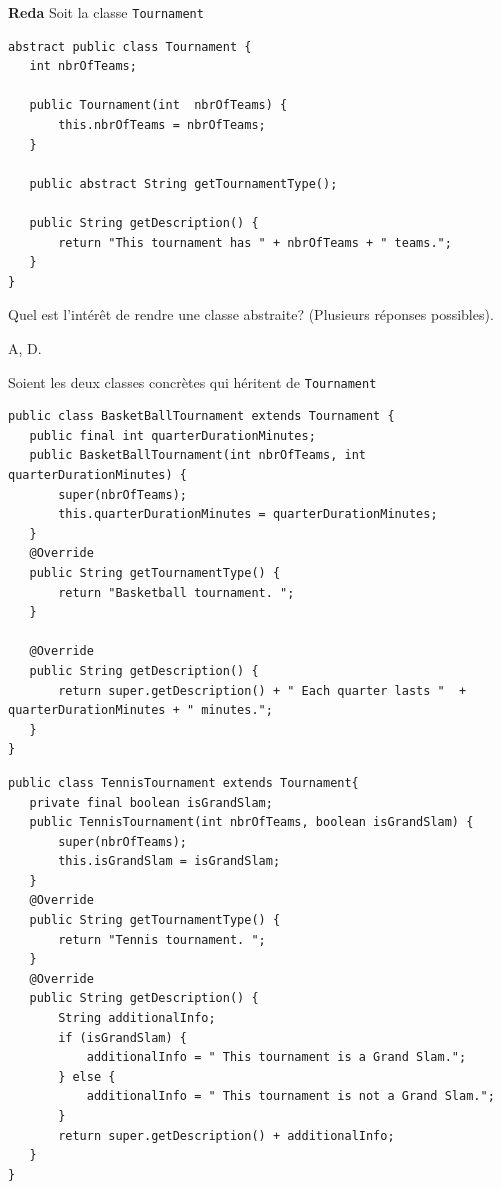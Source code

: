 \begin{Exercice}[5 minutes]\textbf{Reda}
Soit la classe \texttt{Tournament}

\begin{lstlisting}[style=javastyle]
abstract public class Tournament {
   int nbrOfTeams;

   public Tournament(int  nbrOfTeams) {
       this.nbrOfTeams = nbrOfTeams;
   }

   public abstract String getTournamentType();

   public String getDescription() {
       return "This tournament has " + nbrOfTeams + " teams.";
   }
}
\end{lstlisting}

Quel est l’intérêt de rendre une classe abstraite? (Plusieurs réponses possibles). \newline 


\begin{solution}
A, D. 
\end{solution}

\vspace*{0.4cm}

Soient les deux classes concrètes qui héritent de \texttt{Tournament}

\begin{lstlisting}[style=javastyle]
public class BasketBallTournament extends Tournament {
   public final int quarterDurationMinutes;
   public BasketBallTournament(int nbrOfTeams, int quarterDurationMinutes) {
       super(nbrOfTeams);
       this.quarterDurationMinutes = quarterDurationMinutes;
   }
   @Override
   public String getTournamentType() {
       return "Basketball tournament. ";
   }

   @Override
   public String getDescription() {
       return super.getDescription() + " Each quarter lasts "  + quarterDurationMinutes + " minutes.";
   }
}
\end{lstlisting}

\begin{lstlisting}[style=javastyle]
public class TennisTournament extends Tournament{
   private final boolean isGrandSlam;
   public TennisTournament(int nbrOfTeams, boolean isGrandSlam) {
       super(nbrOfTeams);
       this.isGrandSlam = isGrandSlam;
   }
   @Override
   public String getTournamentType() {
       return "Tennis tournament. ";
   }
   @Override
   public String getDescription() {
       String additionalInfo;
       if (isGrandSlam) {
           additionalInfo = " This tournament is a Grand Slam.";
       } else {
           additionalInfo = " This tournament is not a Grand Slam.";
       }
       return super.getDescription() + additionalInfo;
   }
}
\end{lstlisting}


\end{Exercice}
